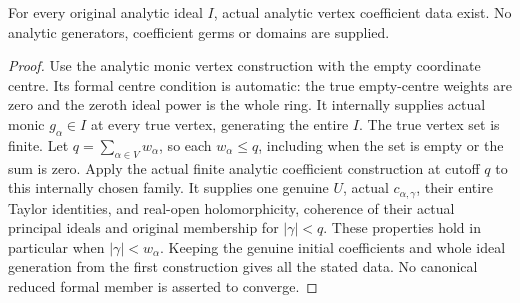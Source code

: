 \begin{theorem}
\label{hir:actual-original-analytic-vertex-coefficient-data-existence}
\leanok
For every original analytic ideal $I$, actual analytic vertex coefficient
data exist. No analytic generators, coefficient germs or domains are supplied.
\end{theorem}
\begin{proof}
Use the analytic monic vertex construction with the empty coordinate centre.
Its formal centre condition is automatic: the true empty-centre weights are
zero and the zeroth ideal power is the whole ring. It internally supplies
actual monic $g_\alpha\in I$ at every true vertex, generating the entire $I$.
The true vertex set is finite. Let $q=\sum_{\alpha\in V}w_\alpha$, so each
$w_\alpha\leq q$, including when the set is empty or the sum is zero.
Apply the actual finite analytic coefficient construction at cutoff $q$
to this internally chosen family. It supplies one genuine $U$, actual
$c_{\alpha,\gamma}$, their entire Taylor identities, and real-open
holomorphicity, coherence of their actual principal ideals and original
membership for $|\gamma|<q$. These properties hold in particular when
$|\gamma|<w_\alpha$. Keeping the genuine initial coefficients and
whole ideal generation from the first construction gives all the stated
data. No canonical reduced formal member is asserted to converge.
\end{proof}

